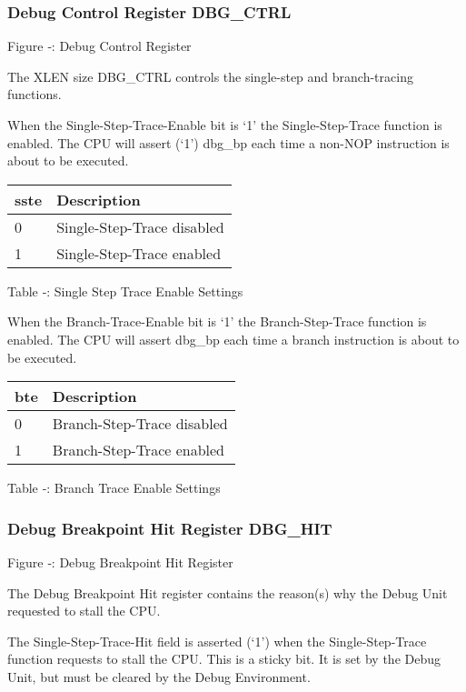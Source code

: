 \subsubsection{Debug Control Register
DBG\_CTRL}\label{debug-control-register-dbg_ctrl}

\missingfigure{}

Figure ‑: Debug Control Register

The XLEN size DBG\_CTRL controls the single-step and branch-tracing
functions.

When the Single-Step-Trace-Enable bit is `1' the Single-Step-Trace
function is enabled. The CPU will assert (`1') dbg\_bp each time a
non-NOP instruction is about to be executed.

\begin{longtable}[]{@{}ll@{}}
\toprule
sste & Description\tabularnewline
\midrule
\endhead
0 & Single-Step-Trace disabled\tabularnewline
1 & Single-Step-Trace enabled\tabularnewline
\bottomrule
\end{longtable}

Table ‑: Single Step Trace Enable Settings

When the Branch-Trace-Enable bit is `1' the Branch-Step-Trace function
is enabled. The CPU will assert dbg\_bp each time a branch instruction
is about to be executed.

\begin{longtable}[]{@{}ll@{}}
\toprule
bte & Description\tabularnewline
\midrule
\endhead
0 & Branch-Step-Trace disabled\tabularnewline
1 & Branch-Step-Trace enabled\tabularnewline
\bottomrule
\end{longtable}

Table ‑: Branch Trace Enable Settings

\subsubsection{Debug Breakpoint Hit Register
DBG\_HIT}\label{debug-breakpoint-hit-register-dbg_hit}

\missingfigure{}

Figure ‑: Debug Breakpoint Hit Register

The Debug Breakpoint Hit register contains the reason(s) why the Debug
Unit requested to stall the CPU.

The Single-Step-Trace-Hit field is asserted (`1') when the
Single-Step-Trace function requests to stall the CPU. This is a sticky
bit. It is set by the Debug Unit, but must be cleared by the Debug
Environment.

